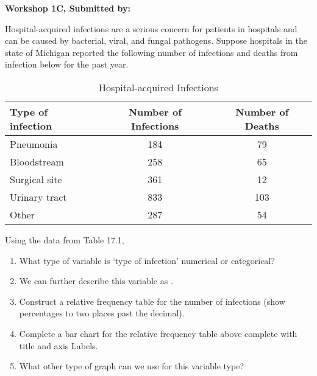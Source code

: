 \documentclass[11pt]{book}\usepackage[]{graphicx}\usepackage[]{color}
\begin{document}
\begin{exercises}
\begin{exercise}
    \begin{center}
\begin{flushleft}\textbf{ \large \hfill Workshop 1C, Submitted by: }\end{flushleft}

\end{center}

Hospital-acquired infections are a serious concern for patients in hospitals and can be caused by bacterial, viral, and fungal pathogens.  Suppose hospitals in the state of Michigan reported the following number of infections and deaths from infection below for the past year.

\begin{table}[ht]
\centering
\caption{Hospital-acquired Infections}
\begin{tabular}{@{} lcc @{}} \hline
Type of infection & Number of Infections & Number of Deaths \\ \hline
Pneumonia & 184 & 79 \\
Bloodstream & 258 & 65 \\
Surgical site &	361 & 12 \\
Urinary tract	&	833 & 103 \\
Other	& 287 & 54 \\ \hline
\end{tabular}
\end{table}

    Using the data from Table 17.1,

\begin{enumerate}
  \item What type of variable is `type of infection' numerical or categorical?
  \item	We can further describe this variable as \underline{\phantom{xxxxxxxxxxxxxxx}}.
  \item	Construct a relative frequency table for the number of infections (show percentages to two places past the decimal).
  \item	Complete a bar chart for the relative frequency table above complete with title and axis Labels.
  \item	What other type of graph can we use for this variable type?
\end{enumerate}


\end{exercise}
\end{exercises}
\end{document}
